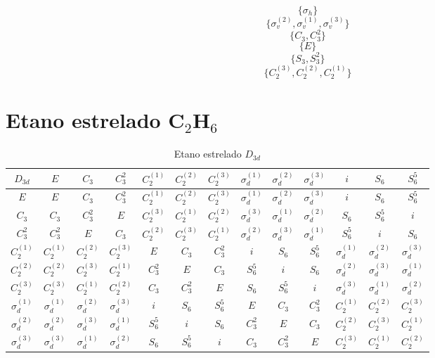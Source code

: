 \documentclass[a4paper,10pt]{article}
\begin{document}
$$
\{ \sigma_h \}
$$
$$
\{ \sigma_v^{(2)}, \sigma_v^{(1)}, \sigma_v^{(3)} \}
$$
$$
\{ C_3, C_3^2 \}
$$
$$
\{ E \}
$$
$$
\{ S_3, S_3^2 \}
$$
$$
\{ C_2^{(3)}, C_2^{(2)}, C_2^{(1)} \}
$$


\section*{Etano estrelado C$_2$H$_6$}

\begin{table}[ht]
\caption{Etano estrelado $D_{3d}$}
\centering


\begin{tabular} { |c|c c c c c c c c c c c c | }
\hline
$D_{3d}$ & $E$ & $C_3$ & $C_3^2$ & $C_2^{(1)}$ & $C_2^{(2)}$ & $C_2^{(3)}$ & $\sigma_d^{(1)}$ & $\sigma_d^{(2)}$ & $\sigma_d^{(3)}$ & $i$ & $S_6$ & $S_6^5$ \\
\hline
$E$ & $E$ & $C_3$ & $C_3^2$ & $C_2^{(1)}$ & $C_2^{(2)}$ & $C_2^{(3)}$ & $\sigma_d^{(1)}$ & $\sigma_d^{(2)}$ & $\sigma_d^{(3)}$ & $i$ & $S_6$ & $S_6^5$ \\
$C_3$ & $C_3$ & $C_3^2$ & $E$ & $C_2^{(3)}$ & $C_2^{(1)}$ & $C_2^{(2)}$ & $\sigma_d^{(3)}$ & $\sigma_d^{(1)}$ & $\sigma_d^{(2)}$ & $S_6$ & $S_6^5$ & $i$ \\
$C_3^2$ & $C_3^2$ & $E$ & $C_3$ & $C_2^{(2)}$ & $C_2^{(3)}$ & $C_2^{(1)}$ & $\sigma_d^{(2)}$ & $\sigma_d^{(3)}$ & $\sigma_d^{(1)}$ & $S_6^5$ & $i$ & $S_6$ \\
$C_2^{(1)}$ & $C_2^{(1)}$ & $C_2^{(2)}$ & $C_2^{(3)}$ & $E$ & $C_3$ & $C_3^2$ & $i$ & $S_6$ & $S_6^5$ & $\sigma_d^{(1)}$ & $\sigma_d^{(2)}$ & $\sigma_d^{(3)}$ \\
$C_2^{(2)}$ & $C_2^{(2)}$ & $C_2^{(3)}$ & $C_2^{(1)}$ & $C_3^2$ & $E$ & $C_3$ & $S_6^5$ & $i$ & $S_6$ & $\sigma_d^{(2)}$ & $\sigma_d^{(3)}$ & $\sigma_d^{(1)}$ \\
$C_2^{(3)}$ & $C_2^{(3)}$ & $C_2^{(1)}$ & $C_2^{(2)}$ & $C_3$ & $C_3^2$ & $E$ & $S_6$ & $S_6^5$ & $i$ & $\sigma_d^{(3)}$ & $\sigma_d^{(1)}$ & $\sigma_d^{(2)}$ \\
$\sigma_d^{(1)}$ & $\sigma_d^{(1)}$ & $\sigma_d^{(2)}$ & $\sigma_d^{(3)}$ & $i$ & $S_6$ & $S_6^5$ & $E$ & $C_3$ & $C_3^2$ & $C_2^{(1)}$ & $C_2^{(2)}$ & $C_2^{(3)}$ \\
$\sigma_d^{(2)}$ & $\sigma_d^{(2)}$ & $\sigma_d^{(3)}$ & $\sigma_d^{(1)}$ & $S_6^5$ & $i$ & $S_6$ & $C_3^2$ & $E$ & $C_3$ & $C_2^{(2)}$ & $C_2^{(3)}$ & $C_2^{(1)}$ \\
$\sigma_d^{(3)}$ & $\sigma_d^{(3)}$ & $\sigma_d^{(1)}$ & $\sigma_d^{(2)}$ & $S_6$ & $S_6^5$ & $i$ & $C_3$ & $C_3^2$ & $E$ & $C_2^{(3)}$ & $C_2^{(1)}$ & $C_2^{(2)}$ \\

\end{tabular}
\end{table}
\end{document}
